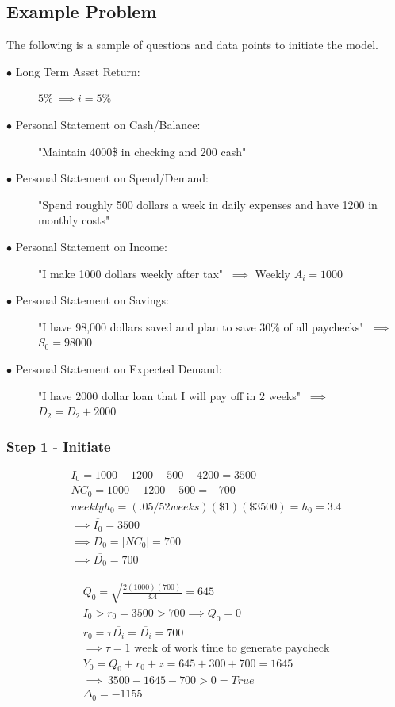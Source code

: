 \documentclass{article}
\begin{document}
\subsection{Example Problem}

The following is a sample of questions and data points to initiate the model. 

\begin{description}
	\item[$\bullet$ Long Term Asset Return:] $5\% \: \implies i = 5\%$
	\item[$\bullet$ Personal Statement on Cash/Balance:] "Maintain 4000\$ in checking and 200 cash"
	\item[$\bullet$ Personal Statement on Spend/Demand:] "Spend roughly 500 dollars a week in daily expenses and have 1200 in monthly costs"
	\item[$\bullet$ Personal Statement on Income:] "I make 1000 dollars weekly after tax" $\: \implies$ Weekly $A_{i} =  1000 $
	\item[$\bullet$ Personal Statement on Savings:] "I have 98,000 dollars saved and plan to save 30\% of all paychecks" $\: \implies$ \: $S_{0} =  98000 $
	\subitem[$\implies \: z =  1000*.3 = 300 $]
	\item[$\bullet$ Personal Statement on Expected Demand:] "I have 2000 dollar loan that I will pay off in 2 weeks" $\: \implies$ \: $D_{2} =  D_{2} + 2000 $
\end{description}

\subsubsection{Step 1 - Initiate}

\begin{equation}
	\begin{split}
		I_{0} = 1000 - 1200 -500 + 4200 = 3500\\
		NC_{0} = 1000 - 1200 - 500 = -700\\
		weekly h_{0} = (.05/52 weeks)(\$1)(\$3500) = h_{0} = 3.4 \\
		\implies \overline{I_{0}} =  3500 \\
		\implies D_{0} = |NC_{0}|  = 700 \\
		\implies \overline{D_{0}} = 700 
	\end{split}
\end{equation}
\FloatBarrier

\begin{equation}
	\begin{split}
		Q_{0} =  \sqrt{\frac{2(1000)(700)}{3.4}} = 645\\
		I_{0} > r_{0} =3500 > 700 \implies Q_{0} = 0\\
		r_{0} =  \tau\overline{D_{i}} = \overline{D_{i}} = 700\\
		\implies \tau = \text{1 week of work time to generate paycheck}\\
		Y_{0} = Q_{0} + r_{0} + z = 645 + 300 + 700 = 1645\\
		\implies \: 3500 - 1645 - 700 > 0  = True \\
		\Delta_{0} = -1155
	\end{split}
\end{equation}
\FloatBarrier
\end{document}
